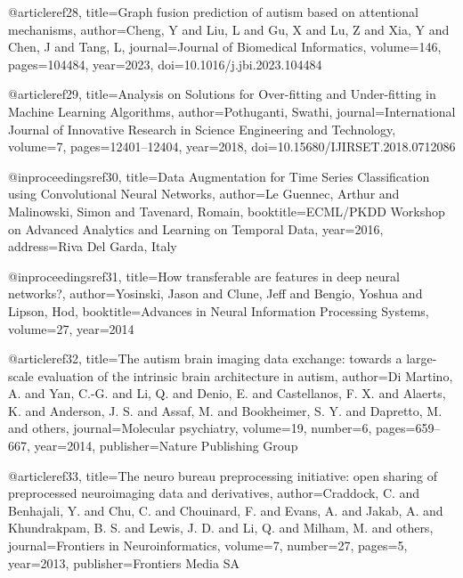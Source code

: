 @article{ref28,
  title={Graph fusion prediction of autism based on attentional mechanisms},
  author={Cheng, Y and Liu, L and Gu, X and Lu, Z and Xia, Y and Chen, J and Tang, L},
  journal={Journal of Biomedical Informatics},
  volume={146},
  pages={104484},
  year={2023},
  doi={10.1016/j.jbi.2023.104484}
}

@article{ref29,
  title={Analysis on Solutions for Over-fitting and Under-fitting in Machine Learning Algorithms},
  author={Pothuganti, Swathi},
  journal={International Journal of Innovative Research in Science Engineering and Technology},
  volume={7},
  pages={12401--12404},
  year={2018},
  doi={10.15680/IJIRSET.2018.0712086}
}

@inproceedings{ref30,
  title={Data Augmentation for Time Series Classification using Convolutional Neural Networks},
  author={Le Guennec, Arthur and Malinowski, Simon and Tavenard, Romain},
  booktitle={ECML/PKDD Workshop on Advanced Analytics and Learning on Temporal Data},
  year={2016},
  address={Riva Del Garda, Italy}
}

@inproceedings{ref31,
  title={How transferable are features in deep neural networks?},
  author={Yosinski, Jason and Clune, Jeff and Bengio, Yoshua and Lipson, Hod},
  booktitle={Advances in Neural Information Processing Systems},
  volume={27},
  year={2014}
}

@article{ref32,
  title={The autism brain imaging data exchange: towards a large-scale evaluation of the intrinsic brain architecture in autism},
  author={Di Martino, A. and Yan, C.-G. and Li, Q. and Denio, E. and Castellanos, F. X. and Alaerts, K. and Anderson, J. S. and Assaf, M. and Bookheimer, S. Y. and Dapretto, M. and others},
  journal={Molecular psychiatry},
  volume={19},
  number={6},
  pages={659--667},
  year={2014},
  publisher={Nature Publishing Group}
}

@article{ref33,
  title={The neuro bureau preprocessing initiative: open sharing of preprocessed neuroimaging data and derivatives},
  author={Craddock, C. and Benhajali, Y. and Chu, C. and Chouinard, F. and Evans, A. and Jakab, A. and Khundrakpam, B. S. and Lewis, J. D. and Li, Q. and Milham, M. and others},
  journal={Frontiers in Neuroinformatics},
  volume={7},
  number={27},
  pages={5},
  year={2013},
  publisher={Frontiers Media SA}
}